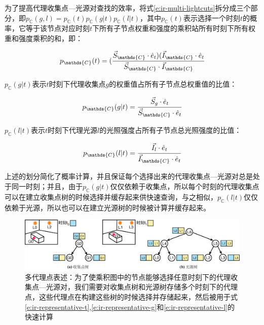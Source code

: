 为了提高代理收集点—光源对查找的效率，\cite{a:MultidimensionalLightcuts}将式\ref{e:ir-multi-lightcuts}拆分成三个部分，即$p_{\mathds{C}}(g,l)=p_{\mathds{C}}(t)p_{\mathds{C}}(g|t)p_{\mathds{C}}(l|t)$，其中$p_{\mathds{C}}(t)$表示选择一个时刻$t$的概率，它等于该节点对应时刻$t$下所有子节点权重和强度的乘积站所有时刻下所有权重和强度乘积的和，即：

\begin{equation}\label{e:ir-representative-t}
	p_{\mathds{C}}(t)=( \cfrac{\vec{S}_{\mathds{C}}\cdot\hat{e}_t)( \vec{I}_{\mathds{C}}\cdot\hat{e}_t}{\vec{S}_{\mathds{C}}\cdot\vec{I}_{\mathds{C}}}
\end{equation}

\noindent $p_{\mathds{C}}(g|t)$表示$t$时刻下代理收集点$g$的权重值占所有子节点总权重值的比值：

\begin{equation}\label{e:ir-representative-g}
	p_{\mathds{C}}(g|t)= \cfrac{\vec{S}_g\cdot\hat{e}_t}{\vec{S}_{\mathds{C}}\cdot\hat{e}_t}
\end{equation}

\noindent $p_{\mathds{C}}(l|t)$表示$t$时刻下代理光源$l$的光照强度占所有子节点总光照强度的比值：

\begin{equation}\label{e:ir-representative-l}
	p_{\mathds{C}}(l|t)= \cfrac{\vec{I}_l\cdot\hat{e}_t}{\vec{I}_{\mathds{C}}\cdot\hat{e}_t}
\end{equation}

\noindent 上述的划分简化了概率计算，并且保证每个选择出来的代理收集点—光源对总是处于同一时刻；并且，由于$p_{\mathds{C}}(g|t)$仅仅依赖于收集点，所以每个时刻的代理收集点可以在建立收集点树的时候选择并缓存起来供快速查询，与之相似，$p_{\mathds{C}}(l|t)$仅仅依赖于光源，所以也可以在建立光源树的时候被计算并缓存起来。

\begin{figure}
\begin{fullwidth}
	\includegraphics[width=1.0\thewidth]{figures/ir/multiple-representatives}
	\caption{多代理点表述：为了使乘积图中的节点能够选择任意时刻下的代理收集点—光源对，我们需要对收集点树和光源树存储多个时刻下的代理点，这些代理点在构建这些树的时候选择并存储起来，然后被用于式\ref{e:ir-representative-t},\ref{e:ir-representative-g}和\ref{e:ir-representative-l}的快速计算}
	\label{f:ir-multiple-representatives}
\end{fullwidth}
\end{figure}


